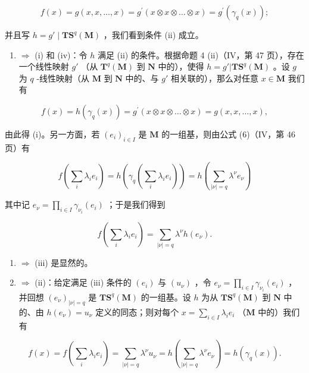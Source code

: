 \[
f (x) = g (x, x, \dots , x) = g ^ {\prime} (x \otimes x \otimes \dots \otimes x) = g ^ {\prime} (\gamma_ {q} (x));
\]

并且写 \(h = g' \mid \mathbf{TS}^q(\mathbf{M})\) ，我们看到条件 (ii) 成立。

\begin{enumerate}
\def\labelenumi{(\roman{enumi})}
\setcounter{enumi}{1}
\tightlist
\item
  \(\Rightarrow\) (i) 和 (iv)：令 \(h\) 满足 (ii) 的条件。根据命题 4 (ii)（IV，第 47 页），存在一个线性映射 \(g'\) （从 \(\mathbf{T}^q (\mathbf{M})\) 到 \(\mathbf{N}\) 中的），使得 \(h = g'|\mathbf{TS}^q (\mathbf{M})\) 。设 \(g\) 为 \(q\) -线性映射（从 \(\mathbf{M}\) 到 \(\mathbf{N}\) 中的、与 \(g'\) 相关联的），那么对任意 \(x\in \mathbf{M}\) 我们有
\end{enumerate}

\[
f (x) = h \left(\gamma_ {q} (x)\right) = g ^ {\prime} (x \otimes x \otimes \dots \otimes x) = g (x, x, \dots , x),
\]

由此得 (i)。另一方面，若 \((e_i)_{i\in I}\) 是 \(\mathbf{M}\) 的一组基，则由公式 (6)（IV，第 46 页）有

\[
f \left(\sum_ {i} \lambda_ {i} e _ {i}\right) = h \left(\gamma_ {q} \left(\sum_ {i} \lambda_ {i} e _ {i}\right)\right) = h \left(\sum_ {| \nu | = q} \lambda^ {\nu} e _ {\nu}\right)
\]

其中记 \(e_{\nu} = \prod_{i\in I}\gamma_{\nu_i}(e_i)\) ；于是我们得到

\[
f \left(\sum_ {i} \lambda_ {i} e _ {i}\right) = \sum_ {| \nu | = q} \lambda^ {\nu} h \left(e _ {\nu}\right).
\]

\begin{enumerate}
\def\labelenumi{(\roman{enumi})}
\setcounter{enumi}{3}
\item
  \(\Rightarrow\) (iii) 是显然的。
\item
  \(\Rightarrow\) (ii)：给定满足 (iii) 条件的 \((e_i)\) 与 \((u_\nu)\) ，令 \(e_\nu = \prod_{i\in I}\gamma_{\nu_i}(e_i)\) ，并回想 \((e_\nu)_{|\nu| = q}\) 是 \(\mathbf{TS}^q (\mathbf{M})\) 的一组基。设 \(h\) 为从 \(\mathbf{TS}^q (\mathbf{M})\) 到 \(\mathbf{N}\) 中的、由 \(h(e_{\nu}) = u_{\nu}\) 定义的同态；则对每个 \(x = \sum_{i\in I}\lambda_i e_i\) （\(\mathbf{M}\) 中的）我们有
\end{enumerate}

\[
f (x) = f \left(\sum_ {i} \lambda_ {i} e _ {i}\right) = \sum_ {| \nu | = q} \lambda^ {\nu} u _ {\nu} = h \left(\sum_ {| \nu | = q} \lambda^ {\nu} e _ {\nu}\right) = h (\gamma_ {q} (x)).
\]

